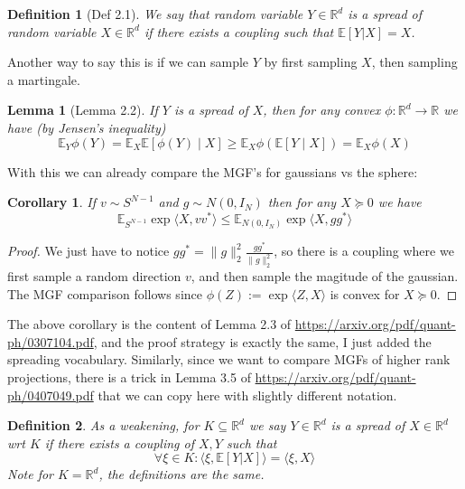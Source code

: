 \documentclass{article}
\newtheorem{corollary}[theorem]{Corollary}
\newtheorem{lemma}[theorem]{Lemma}
\newtheorem{definition}{Definition}
\newcommand{\R}{{\mathbb{R}}}
\newcommand{\E}{\mathbb{E}}
\begin{document}
\begin{definition} [Def 2.1]
We say that random variable $Y \in \R^{d}$ is a spread of random variable $X \in \R^{d}$ if
there exists a coupling such that $\E[Y |X] = X$. 
\end{definition}

Another way to say this is if we can sample $Y$ by first sampling $X$, then sampling a martingale. 

\begin{lemma} [Lemma 2.2]
If $Y$ is a spread of $X$, then for any convex $\phi : \R^{d} \to \R$ we have (by Jensen's inequality)
\[ \E_{Y} \phi(Y) = \E_{X} \E [ \phi(Y) \mid X ] \geq \E_{X} \phi(\E[Y \mid X]) = \E_{X} \phi(X)      \]
\end{lemma}

With this we can already compare the MGF's for gaussians vs the sphere:
\begin{corollary}
If $v \sim S^{N-1}$ and $g \sim N(0,I_{N})$ then for any $X \succeq 0$ we have
\[ \E_{S^{N-1}} \exp \langle X, v v^{*} \rangle \leq \E_{N(0,I_{N})} \exp \langle X, g g^{*} \rangle     \]
\end{corollary}
\begin{proof}
We just have to notice $g g^{*} = \|g\|_{2}^{2} \frac{g g^{*}}{\|g\|_{2}^{2}}$, so there is a coupling where we first sample a random direction $v$, and then sample the magitude of the gaussian. The MGF comparison follows since $\phi(Z) := \exp \langle Z, X \rangle$ is convex for $X \succeq 0$. 
\end{proof}

The above corollary is the content of Lemma 2.3 of \url{https://arxiv.org/pdf/quant-ph/0307104.pdf}, and the proof strategy is exactly the same, I just added the spreading vocabulary. Similarly, since we want to compare MGFs of higher rank projections, there is a trick in Lemma 3.5 of \url{https://arxiv.org/pdf/quant-ph/0407049.pdf} that we can copy here with slightly different notation. 

\begin{definition}
As a weakening, for $K \subseteq \R^{d}$ we say $Y \in \R^{d}$ is a spread of $X \in \R^{d}$ wrt $K$ if
there exists a coupling of $X,Y$ such that 
\[ \forall \xi \in K:  \langle \xi, \E[Y |X] \rangle = \langle \xi, X  \rangle   \]
Note for $K = \R^{d}$, the definitions are the same. 
\end{definition}
\end{document}
